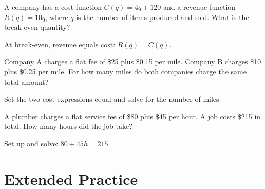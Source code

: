 \documentclass{ximera}
\begin{document}
\begin{problem}
A company has a cost function $C(q) = 4q + 120$ and a revenue function $R(q) = 10q$, where $q$ is the number of items produced and sold. What is the break-even quantity?
\begin{hint}
At break-even, revenue equals cost: $R(q) = C(q)$.
\end{hint}
\begin{multipleChoice}
\end{multipleChoice}
\end{problem}

\begin{problem}
Company A charges a flat fee of \$25 plus \$0.15 per mile. Company B charges \$10 plus \$0.25 per mile. For how many miles do both companies charge the same total amount?
\begin{hint}
Set the two cost expressions equal and solve for the number of miles.
\end{hint}
\begin{multipleChoice}
\end{multipleChoice}
\end{problem}

\begin{problem}
A plumber charges a flat service fee of \$80 plus \$45 per hour. A job costs \$215 in total. How many hours did the job take?
\begin{hint}
Set up and solve: $80 + 45h = 215$.
\end{hint}
\begin{multipleChoice}
\end{multipleChoice}
\end{problem}


\bigskip
\section*{Extended Practice}
\end{document}
